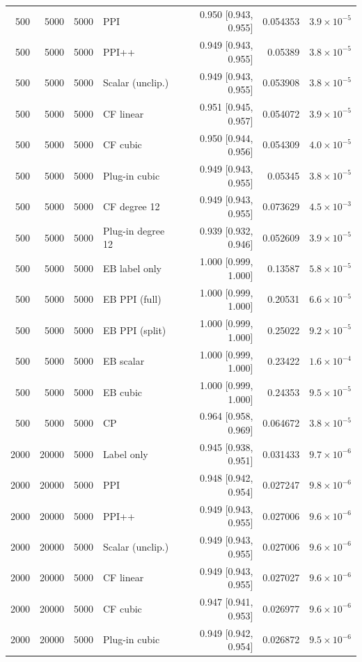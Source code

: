 {\begin{longtable}{rrrlrrr}
500 & 5000 & 5000 & PPI & 0.950 [0.943, 0.955] & 0.054353 & $3.9\times 10^{-5}$ \\
500 & 5000 & 5000 & PPI++ & 0.949 [0.943, 0.955] & 0.05389 & $3.8\times 10^{-5}$ \\
500 & 5000 & 5000 & Scalar (unclip.) & 0.949 [0.943, 0.955] & 0.053908 & $3.8\times 10^{-5}$ \\
500 & 5000 & 5000 & CF linear & 0.951 [0.945, 0.957] & 0.054072 & $3.9\times 10^{-5}$ \\
500 & 5000 & 5000 & CF cubic & 0.950 [0.944, 0.956] & 0.054309 & $4.0\times 10^{-5}$ \\
500 & 5000 & 5000 & Plug-in cubic & 0.949 [0.943, 0.955] & 0.05345 & $3.8\times 10^{-5}$ \\
500 & 5000 & 5000 & CF degree 12 & 0.949 [0.943, 0.955] & 0.073629 & $4.5\times 10^{-3}$ \\
500 & 5000 & 5000 & Plug-in degree 12 & 0.939 [0.932, 0.946] & 0.052609 & $3.9\times 10^{-5}$ \\
500 & 5000 & 5000 & EB label only & 1.000 [0.999, 1.000] & 0.13587 & $5.8\times 10^{-5}$ \\
500 & 5000 & 5000 & EB PPI (full) & 1.000 [0.999, 1.000] & 0.20531 & $6.6\times 10^{-5}$ \\
500 & 5000 & 5000 & EB PPI (split) & 1.000 [0.999, 1.000] & 0.25022 & $9.2\times 10^{-5}$ \\
500 & 5000 & 5000 & EB scalar & 1.000 [0.999, 1.000] & 0.23422 & $1.6\times 10^{-4}$ \\
500 & 5000 & 5000 & EB cubic & 1.000 [0.999, 1.000] & 0.24353 & $9.5\times 10^{-5}$ \\
500 & 5000 & 5000 & CP & 0.964 [0.958, 0.969] & 0.064672 & $3.8\times 10^{-5}$ \\
2000 & 20000 & 5000 & Label only & 0.945 [0.938, 0.951] & 0.031433 & $9.7\times 10^{-6}$ \\
2000 & 20000 & 5000 & PPI & 0.948 [0.942, 0.954] & 0.027247 & $9.8\times 10^{-6}$ \\
2000 & 20000 & 5000 & PPI++ & 0.949 [0.943, 0.955] & 0.027006 & $9.6\times 10^{-6}$ \\
2000 & 20000 & 5000 & Scalar (unclip.) & 0.949 [0.943, 0.955] & 0.027006 & $9.6\times 10^{-6}$ \\
2000 & 20000 & 5000 & CF linear & 0.949 [0.943, 0.955] & 0.027027 & $9.6\times 10^{-6}$ \\
2000 & 20000 & 5000 & CF cubic & 0.947 [0.941, 0.953] & 0.026977 & $9.6\times 10^{-6}$ \\
2000 & 20000 & 5000 & Plug-in cubic & 0.949 [0.942, 0.954] & 0.026872 & $9.5\times 10^{-6}$ \\

\end{longtable}}
